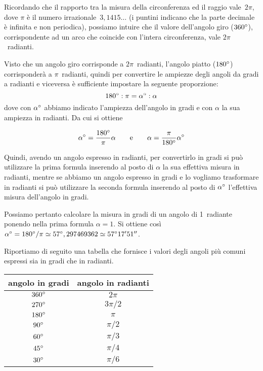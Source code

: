 Ricordando che il rapporto tra la misura della circonferenza ed il raggio vale~$2\pi$, dove $\pi$ è il numero irrazionale~$3,1415\ldots{}$ (i puntini indicano che la parte decimale è infinita e non periodica), possiamo intuire che il valore dell'angolo giro ($360{}^{\circ}$), corrispondente ad un arco che coincide con l'intera circonferenza, vale $2\pi$~radianti.

Visto che un angolo giro corrisponde a $2\pi$~radianti, l'angolo piatto ($180{}^{\circ}$) corrisponderà a $\pi$~radianti, quindi per convertire le ampiezze degli angoli da gradi a radianti e viceversa è sufficiente impostare la seguente proporzione:
\[180{}^{\circ} : \pi = \alpha{}^{\circ} : \alpha\]
dove con $\alpha{}^{\circ}$ abbiamo indicato l'ampiezza dell'angolo in gradi e con $\alpha$ la sua ampiezza in radianti. Da cui si ottiene

\[\alpha{}^{\circ} = \dfrac{180{}^{\circ}}{\pi}\alpha\qquad\text{e}\qquad\alpha = \dfrac{\pi}{180{}^{\circ}}\alpha{}^{\circ}\]

Quindi, avendo un angolo espresso in radianti, per convertirlo in gradi si può utilizzare la prima formula inserendo al posto di $\alpha$ la sua effettiva misura in radianti, mentre se abbiamo un angolo espresso in gradi e lo vogliamo trasformare in radianti si può utilizzare la seconda formula inserendo al posto di $\alpha{}^{\circ}$ l'effettiva misura dell'angolo in gradi.

Possiamo pertanto calcolare la misura in gradi di un angolo di 1~radiante ponendo nella prima formula $\alpha=1$. Si ottiene così $\alpha{}^{\circ} = 180{}^{\circ}/\pi \simeq 57{}^{\circ},297469362 \simeq 57{}^{\circ} 17'51''$.

Riportiamo di seguito una tabella che fornisce i valori degli angoli più comuni espressi sia in gradi che in radianti.

\begin{center}
\begin{tabular}{cc}
\toprule
angolo in gradi	& angolo in radianti\\
\midrule
$360{}^{\circ}$ & $2\pi$\\
$270{}^{\circ}$ & $3\pi/2$\\
$180{}^{\circ}$ & $\pi$\\
$90{}^{\circ}$ & $\pi/2$\\
$60{}^{\circ}$ & $\pi/3$\\
$45{}^{\circ}$ & $\pi/4$\\
$30{}^{\circ}$ & $\pi/6$\\
\bottomrule
\end{tabular}
\end{center}

